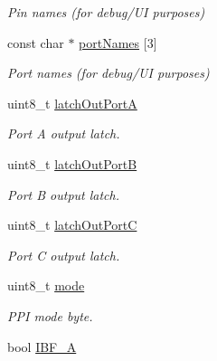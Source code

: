 \begin{DoxyCompactItemize}
\begin{DoxyCompactList}\small\item\em Pin names (for debug/\-U\-I purposes) \end{DoxyCompactList}\item 
\hypertarget{classIntel8255_a2439197a04df0425206d5d23328de77d}{const char $\ast$ \hyperlink{classIntel8255_a2439197a04df0425206d5d23328de77d}{port\-Names} \mbox{[}3\mbox{]}}\label{classIntel8255_a2439197a04df0425206d5d23328de77d}

\begin{DoxyCompactList}\small\item\em Port names (for debug/\-U\-I purposes) \end{DoxyCompactList}\item 
\hypertarget{classIntel8255_a789e21fa7684972852c58e484fc8fa05}{uint8\-\_\-t \hyperlink{classIntel8255_a789e21fa7684972852c58e484fc8fa05}{latch\-Out\-Port\-A}}\label{classIntel8255_a789e21fa7684972852c58e484fc8fa05}

\begin{DoxyCompactList}\small\item\em Port A output latch. \end{DoxyCompactList}\item 
\hypertarget{classIntel8255_a6cab7d5af4469ef233e2b86734d0a002}{uint8\-\_\-t \hyperlink{classIntel8255_a6cab7d5af4469ef233e2b86734d0a002}{latch\-Out\-Port\-B}}\label{classIntel8255_a6cab7d5af4469ef233e2b86734d0a002}

\begin{DoxyCompactList}\small\item\em Port B output latch. \end{DoxyCompactList}\item 
\hypertarget{classIntel8255_ae7a6fa5ef9a676a043c28fe17fccd5cf}{uint8\-\_\-t \hyperlink{classIntel8255_ae7a6fa5ef9a676a043c28fe17fccd5cf}{latch\-Out\-Port\-C}}\label{classIntel8255_ae7a6fa5ef9a676a043c28fe17fccd5cf}

\begin{DoxyCompactList}\small\item\em Port C output latch. \end{DoxyCompactList}\item 
\hypertarget{classIntel8255_a9585630ec3ff22e97c26524931dab693}{uint8\-\_\-t \hyperlink{classIntel8255_a9585630ec3ff22e97c26524931dab693}{mode}}\label{classIntel8255_a9585630ec3ff22e97c26524931dab693}

\begin{DoxyCompactList}\small\item\em P\-P\-I mode byte. \end{DoxyCompactList}\item 
\hypertarget{classIntel8255_aab8c8fd1a89d777816aecbcd3b27eea8}{bool \hyperlink{classIntel8255_aab8c8fd1a89d777816aecbcd3b27eea8}{I\-B\-F\-\_\-\-A}}\label{classIntel8255_aab8c8fd1a89d777816aecbcd3b27eea8}


\end{DoxyCompactItemize}
